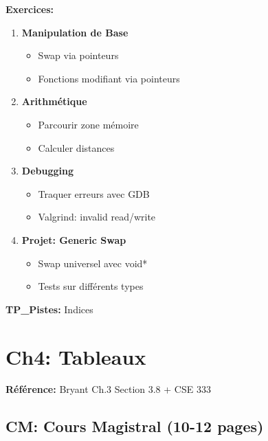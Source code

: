 \documentclass[10pt,a4paper]{article}
\begin{document}
\textbf{Exercices:}
\begin{enumerate}
\item \textbf{Manipulation de Base}
   \begin{itemize}
   \item Swap via pointeurs
   \item Fonctions modifiant via pointeurs
   \end{itemize}

\item \textbf{Arithmétique}
   \begin{itemize}
   \item Parcourir zone mémoire
   \item Calculer distances
   \end{itemize}

\item \textbf{Debugging}
   \begin{itemize}
   \item Traquer erreurs avec GDB
   \item Valgrind: invalid read/write
   \end{itemize}

\item \textbf{Projet: Generic Swap}
   \begin{itemize}
   \item Swap universel avec void*
   \item Tests sur différents types
   \end{itemize}
\end{enumerate}

\textbf{TP\_Pistes:} Indices

\newpage

\section{Ch4: Tableaux}

\textbf{Référence:} Bryant Ch.3 Section 3.8 + CSE 333

\subsection*{CM: Cours Magistral (10-12 pages)}
\end{document}
